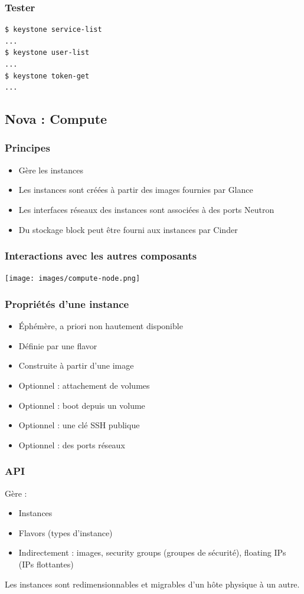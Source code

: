   \begin{frame}[containsverbatim]
    \frametitle{Tester}
\begin{verbatim}
$ keystone service-list
...
$ keystone user-list
...
$ keystone token-get
...
\end{verbatim}
  \end{frame}

  \subsection[Nova]{Nova : Compute}

  \begin{frame}
    \frametitle{Principes}
    \begin{itemize}
      \item Gère les instances
      \item Les instances sont créées à partir des images fournies par Glance
      \item Les interfaces réseaux des instances sont associées à des ports Neutron
      \item Du stockage block peut être fourni aux instances par Cinder
    \end{itemize}
  \end{frame}

  \begin{frame}
    \frametitle{Interactions avec les autres composants}
    \texttt{[image: images/compute-node.png]}
  \end{frame}

  \begin{frame}
    \frametitle{Propriétés d'une instance}
    \begin{itemize}
      \item Éphémère, a priori non hautement disponible
      \item Définie par une flavor
      \item Construite à partir d'une image
      \item Optionnel : attachement de volumes
      \item Optionnel : boot depuis un volume
      \item Optionnel : une clé SSH publique
      \item Optionnel : des ports réseaux
    \end{itemize}
  \end{frame}

  \begin{frame}
    \frametitle{API}
    Gère :
    \begin{itemize}
      \item Instances
      \item Flavors (types d'instance)
      \item Indirectement : images, security groups (groupes de sécurité), floating IPs (IPs flottantes)
    \end{itemize}
    Les instances sont redimensionnables et migrables d'un hôte physique à un autre.
  \end{frame}


